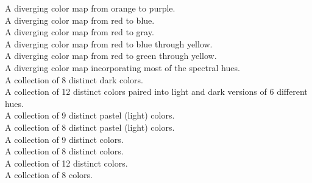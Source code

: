 \begin{longtabu}
   A diverging color map from orange to purple. \\
   A diverging color map from red to blue. \\
   A diverging color map from red to gray. \\
   A diverging color map from red to blue through yellow. \\
   A diverging color map from red to green through yellow. \\
   A diverging color map incorporating most of the
  spectral hues. \\
   A collection of 8 distinct dark colors. \\
   A collection of 12 distinct colors paired into light
  and dark versions of 6 different hues. \\
   A collection of 9 distinct pastel (light) colors. \\
   A collection of 8 distinct pastel (light) colors. \\
   A collection of 9 distinct colors. \\
   A collection of 8 distinct colors. \\
   A collection of 12 distinct colors. \\
   A collection of 8 colors. \\
\end{longtabu}


